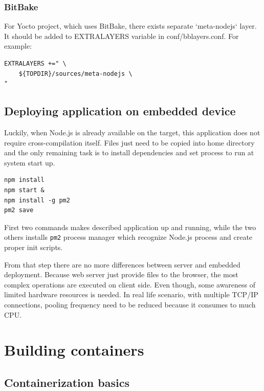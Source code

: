 \documentclass[printmode]{mgr}
\begin{document}
\subsubsection{BitBake}

For Yocto project, which uses BitBake, there exists separate `meta-nodejs` layer.
It should be added to EXTRALAYERS variable in conf/bblayers.conf. For example:
\begin{lstlisting}
EXTRALAYERS +=" \
    ${TOPDIR}/sources/meta-nodejs \
"
\end{lstlisting}



\subsection*{Deploying application on embedded device}

Luckily, when Node.js is already available on the target, this application does not require cross-compilation itself.
Files just need to be copied into home directory and the only remaining task is to install dependencies and set process to run at system start up.

\begin{lstlisting}
npm install
npm start &
npm install -g pm2
pm2 save
\end{lstlisting}

First two commands makes described application up and running, while the two others installs \verb|pm2| process manager which recognize Node.js process and create proper init scripts.

From that step there are no more differences between server and embedded deployment.
Because web server just provide files to the browser, the most complex operations are executed on client side.
Even though, some awareness of limited hardware resources is needed.
In real life scenario, with multiple TCP/IP connections, pooling frequency need to be reduced because it consumes to much CPU.





\section{Building containers}



\subsection*{Containerization basics}
\end{document}
